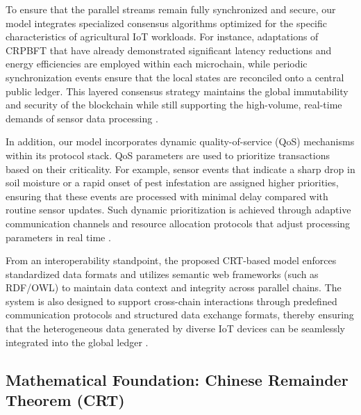 \documentclass[12pt,onecolumn]{IEEEtran} %
\begin{document}
To ensure that the parallel streams remain fully synchronized and secure, our model integrates specialized consensus algorithms optimized for the specific characteristics of agricultural IoT workloads. For instance, adaptations of CRPBFT that have already demonstrated significant latency reductions and energy efficiencies are employed within each microchain, while periodic synchronization events ensure that the local states are reconciled onto a central public ledger. This layered consensus strategy maintains the global immutability and security of the blockchain while still supporting the high-volume, real-time demands of sensor data processing \cite{thiruvenkatasamy2025anonlinetool, huang2025digitaltraceabilityin}.

In addition, our model incorporates dynamic quality-of-service (QoS) mechanisms within its protocol stack. QoS parameters are used to prioritize transactions based on their criticality. For example, sensor events that indicate a sharp drop in soil moisture or a rapid onset of pest infestation are assigned higher priorities, ensuring that these events are processed with minimal delay compared with routine sensor updates. Such dynamic prioritization is achieved through adaptive communication channels and resource allocation protocols that adjust processing parameters in real time \cite{singh2025blockchainandflbased, thiruvenkatasamy2025anonlinetool}.

From an interoperability standpoint, the proposed CRT-based model enforces standardized data formats and utilizes semantic web frameworks (such as RDF/OWL) to maintain data context and integrity across parallel chains. The system is also designed to support cross-chain interactions through predefined communication protocols and structured data exchange formats, thereby ensuring that the heterogeneous data generated by diverse IoT devices can be seamlessly integrated into the global ledger \cite{irfan2025aniotdrivensmart, huang2025digitaltraceabilityin}.

\subsection{Mathematical Foundation: Chinese Remainder Theorem (CRT)}
\label{sec:CRT}
\end{document}
